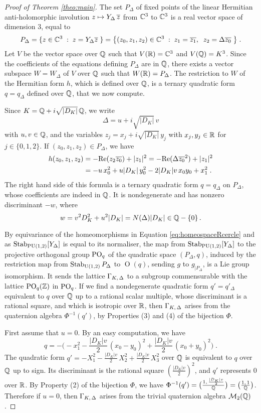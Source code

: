 \documentclass[11pt]{article}
\begin{document}
\medskip
\begin{proof}[Proof of Theorem \ref{theo:main}]
The set $P_\Delta$ of fixed points of the linear Hermitian anti-holomorphic
involution $z\mapsto Y_\Delta \,{\overline{z}}$ from ${\mathbb C}^3$ to ${\mathbb C}^3$ is a
real vector space of dimension $3$, equal to
$$
P_\Delta=\{z\in{\mathbb C}^3\;:\; z=Y_\Delta {\overline{z}}\;\}=
\big\{(z_0,z_1,z_2)\in{\mathbb C}^3\;:\; 
z_1={\overline{z_1}},\;\; z_2=\Delta {\overline{z_0}}\;\big\}\;.
$$
Let $V$ be the vector space over ${\mathbb Q}$ such that $V({\mathbb R})={\mathbb C}^3$ and
$V({\mathbb Q})=K^3$. Since the coefficients of the equations defining
$P_\Delta$ are in ${\mathbb Q}$, there exists a vector subspace $W=W_\Delta$
of $V$ over ${\mathbb Q}$ such that $W({\mathbb R})=P_\Delta$.  The restriction to $W$
of the Hermitian form $h$, which is defined over ${\mathbb Q}$, is a ternary
quadratic form $q=q_\Delta$ defined over ${\mathbb Q}$, that we now compute.

Since $K={\mathbb Q}+i\sqrt{|D_K|}\,{\mathbb Q}$, we write
$$
\Delta=u+i\sqrt{|D_K|}\,v
$$ 
with $u,v\in{\mathbb Q}$, and the variables $z_j=x_j+i\sqrt{|D_K|}\,y_j$
with $x_j, y_j \in {\mathbb R}$ for $j\in\{0,1,2\}$. If $(z_0, z_1,z_2)\in
P_\Delta$, we have
\begin{align*}
h(z_0, z_1,z_2)&=-{\operatorname{Re}}(z_2{\overline{z_0}})+|z_1|^2=
-{\operatorname{Re}}(\Delta{\overline{z_0}}^2)+|z_1|^2\\ &=
-u \,x_0^2+u|D_K|\,y_0^2-2|D_K|v\,x_0y_0+x_1^2\;.
\end{align*}
The right hand side of this formula is a ternary quadratic form
$q=q_\Delta$ on $P_\Delta$, whose coefficients are indeed in ${\mathbb Q}$. It
is nondegenerate and has nonzero discriminant $-w$, where
$$
w=v^2D_K^2+u^2|D_K|= N(\Delta)|D_K|\in{\mathbb Q}-\{0\}\,.
$$


By equivariance of the homeomorphisms in Equation
\eqref{eq:homeospaceRcercle} and as $\operatorname{Stab}_{\operatorname{PU}(1,2)} [Y_\Delta]$ is
equal to its normaliser, the map from $\operatorname{Stab}_{\operatorname{PU}(1,2)} [Y_\Delta]$ to
the projective orthogonal group $\operatorname{PO}_q$ of the quadratic space
$(P_\Delta,q)$, induced by the restriction map from
$\operatorname{Stab}_{\operatorname{U}(1,2)} P_\Delta$ to $\operatorname{O}(q)$,
sending $g$ to $g_{\mid P_\Delta}$, is a Lie group isomorphism. It
sends the lattice $\Gamma_{K,\,\Delta}$ to a subgroup commensurable with
the lattice $\operatorname{PO}_q({\mathbb Z})$ in $\operatorname{PO}_q$.  If we find a nondegenerate
quadratic form $q'=q'_\Delta$ equivalent to $q$ over ${\mathbb Q}$ up to a
rational scalar multiple, whose discriminant is a rational square, and
which is isotropic over ${\mathbb R}$, then $\Gamma_{K,\,\Delta}$ arises from the
quaternion algebra $\Phi^{-1}(q')$, by Properties (3) and (4) of the
bijection $\Phi$.

First assume that $u=0$. By an easy computation, we have
$$
q=-\Big(- x_1^2-\frac{|D_K|v}{2}\,(x_0-y_0)^2+
\frac{|D_K|v}{2} \,(x_0+y_0)^2\Big)\;.
$$ 
The quadratic form $q'=- X_1^2 -\frac{|D_K|v}{2}\,X_2^2+
\frac{|D_K|v}{2}\, X_3^2$ over ${\mathbb Q}$ is equivalent to $q$ over ${\mathbb Q}$
up to sign. Its discriminant is the rational square
$(\frac{|D_K|v}{2})^2$, and $q'$ represents $0$ over ${\mathbb R}$.  By
Property (2) of the bijection $\Phi$, we have $\Phi^{-1}(q')=
\big(\frac{1,\,\frac{|D_K|v}{2}}{{\mathbb Q}}\big)=
\big(\frac{1,\,1}{{\mathbb Q}}\big)$. Therefore if $u=0$, then
$\Gamma_{K,\,\Delta}$ arises from the trivial quaternion algebra
${\cal M}_2({\mathbb Q})$.


\end{proof}
\end{document}
